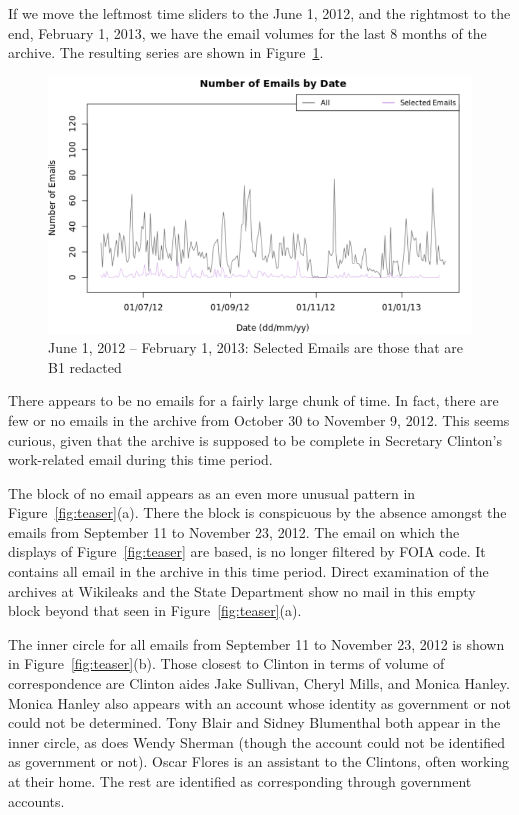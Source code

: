 \documentclass[journal]{vgtc}                %
\begin{document}
If we move the leftmost time sliders to the June 1, 2012, and the rightmost to the end, February 1, 2013, we have the email volumes for the last 8 months of the archive.  The resulting series are shown in Figure~\ref{fig:EmailVolumeB1Jun1On}.
\begin{figure}[h]
\begin{center}
\includegraphics[width=0.95\linewidth]{EmailVolumeB1Jun1On}
\caption{June 1, 2012 -- February 1, 2013:  Selected Emails are those that are B1 redacted}
\label{fig:EmailVolumeB1Jun1On}
\end{center}
\end{figure}
There appears to be no emails for a fairly large chunk of time.  In fact, there are few or no emails in the archive from October 30 to November 9, 2012.  
This seems curious, given that the archive is supposed to be complete in Secretary Clinton's work-related email during this time period.  

The block of no email appears as an even more unusual pattern in Figure~\ref{fig:teaser}(a).  There the block is conspicuous by the absence amongst the emails from September 11 to November 23, 2012.  The email on which the displays of Figure~\ref{fig:teaser} are based, is no longer filtered by FOIA code.  It contains all email in the archive in this time period.  Direct examination of the archives at Wikileaks and the State Department show no mail in this empty block beyond that seen in Figure~\ref{fig:teaser}(a).

The inner circle for all emails from September 11 to November 23, 2012 is shown in Figure~\ref{fig:teaser}(b).  Those closest to Clinton in terms of volume of correspondence are Clinton aides Jake Sullivan, Cheryl Mills, and Monica Hanley.  Monica Hanley also appears with an account whose identity as government or not could not be determined.  Tony Blair and Sidney Blumenthal both appear in the inner circle, as does Wendy Sherman (though the account could not be identified as government or not).  Oscar Flores is an assistant to the Clintons, often working at their home.  The rest are identified as corresponding through government accounts.
\end{document}
